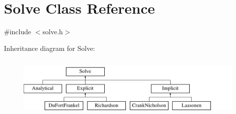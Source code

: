 \hypertarget{class_solve}{}\section{Solve Class Reference}
\label{class_solve}


{\ttfamily \#include $<$solve.\+h$>$}

Inheritance diagram for Solve\+:\begin{figure}[H]
\begin{center}
\leavevmode
\includegraphics[height=3.000000cm]{class_solve}
\end{center}
\end{figure}
